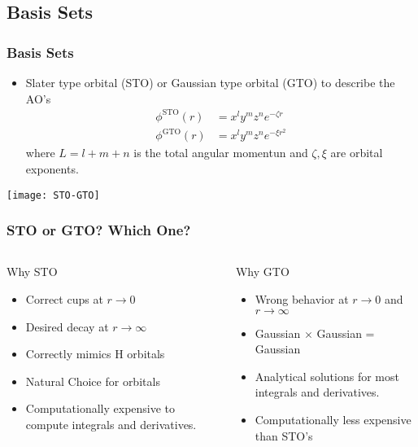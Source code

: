 \documentclass[slidestop,mathserif,compress,xcolor=svgnames]{beamer}
\begin{document}
\subsection{Basis Sets}
\begin{frame}
  \frametitle{\small Basis Sets}
  \begin{itemize}
    \item %
      Slater type orbital (STO) or Gaussian type orbital (GTO) to describe the AO's
    \begin{align*}
      \phi^{\mathrm{STO}}(r) &= x^ly^mz^ne^{-\zeta r}\\
      \phi^{\mathrm{GTO}}(r) &= x^ly^mz^ne^{-\xi r^2}
    \end{align*}
    where $L=l+m+n$ is the total angular momentun and $\zeta,\xi$ are orbital exponents. 
  \end{itemize}
  \begin{center}
    \texttt{[image: STO-GTO]}
  \end{center}
\end{frame}

\begin{frame}
  \frametitle{\small STO or GTO? Which One?}
  \begin{columns}
    \column{5.5cm}
    \vspace{-0.2cm}
    \begin{block}{Why STO}
      \begin{itemize}
	\item Correct cups at $r\rightarrow0$
	\item Desired decay at $r\rightarrow\infty$ 
	\item Correctly mimics H orbitals
	\item Natural Choice for orbitals
	\item Computationally expensive to compute integrals and derivatives.
      \end{itemize}
    \end{block}
    \column{5.5cm}
    \vspace{-0.2cm}
    \begin{block}{Why GTO}
      \begin{itemize}
	\item Wrong behavior at $r\rightarrow0$ and $r\rightarrow\infty$
	\item Gaussian $\times$ Gaussian = Gaussian
	\item Analytical solutions for most integrals and derivatives.
	\item Computationally less expensive than STO's
      \end{itemize}
    \end{block}
  \end{columns}
\end{frame}
\end{document}

